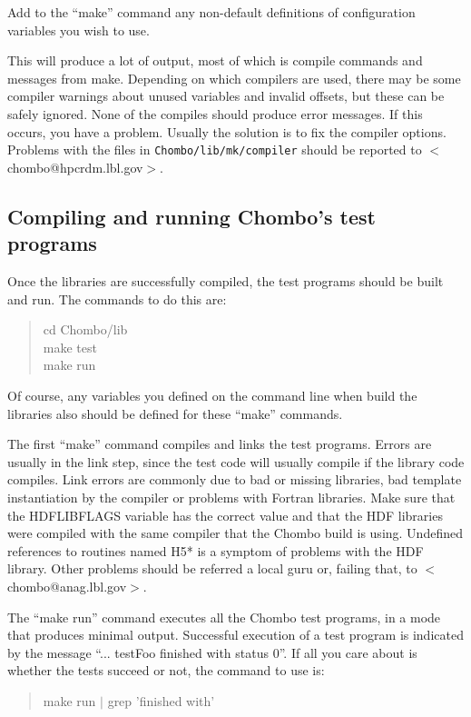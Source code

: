 Add to the ``make'' command any non-default definitions of configuration variables you 
wish to use.

This will produce a lot of output, most of which is compile commands and messages from
make.  Depending on which compilers are used, there may be some compiler warnings about
unused variables and invalid offsets, but these can be safely ignored.  None of the compiles
should produce error messages.  If this occurs, you have a problem.  Usually the solution
is to fix the compiler options.   Problems with the files in {\tt Chombo/lib/mk/compiler}
should be reported to $<$chombo@hpcrdm.lbl.gov$>$.

\subsection{Compiling and running Chombo's test programs}

Once the libraries are successfully compiled, the test programs should be built
and run.  The commands to do this are:
\begin{quote}
 cd Chombo/lib\\
 make test\\
 make run
\end{quote}

Of course, any variables you defined on the command line when build the libraries
also should be defined for these ``make'' commands.

The first ``make'' command compiles and links the test programs.  Errors 
are usually in the link step, since the test code will usually compile if the
library code compiles.  Link errors are commonly due to bad or missing libraries,
bad template instantiation by the compiler or problems with Fortran libraries.
Make sure that the HDFLIBFLAGS variable has the correct value and that the
HDF libraries were compiled with the same compiler that the Chombo build is using.
Undefined references to routines named H5* is a symptom of problems with the
HDF library.  Other problems should be referred a local guru or, failing that,
to $<$chombo@anag.lbl.gov$>$.

The ``make run'' command executes all the Chombo test programs, in a mode that
produces minimal output.   Successful execution of a test program is indicated by
the message ``... testFoo finished with status 0''.  If all you care about is whether
the tests succeed or not, the command to use is:
\begin{quote}
  make run $|$ grep 'finished with'
\end{quote}

